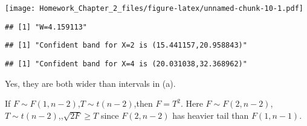 \documentclass[]{article}
\newenvironment{Shaded}{\begin{snugshade}}{\end{snugshade}}
\newcommand{\KeywordTok}[1]{\textcolor[rgb]{0.13,0.29,0.53}{\textbf{#1}}}
\newcommand{\DecValTok}[1]{\textcolor[rgb]{0.00,0.00,0.81}{#1}}
\newcommand{\StringTok}[1]{\textcolor[rgb]{0.31,0.60,0.02}{#1}}
\newcommand{\NormalTok}[1]{#1}
\begin{document}
\texttt{[image: Homework\_Chapter\_2\_files/figure-latex/unnamed-chunk-10-1.pdf]}

\begin{Shaded}
\end{Shaded}

\begin{verbatim}
## [1] "W=4.159113"
\end{verbatim}

\begin{Shaded}
\end{Shaded}

\begin{verbatim}
## [1] "Confident band for X=2 is (15.441157,20.958843)"
\end{verbatim}

\begin{Shaded}
\end{Shaded}

\begin{verbatim}
## [1] "Confident band for X=4 is (20.031038,32.368962)"
\end{verbatim}

Yes, they are both wider than intervals in (a).

If \(F\sim F(1,n-2)\),\(T\sim t(n-2)\),then \(F=T^2\). Here
\(F\sim F(2,n-2)\),\(T\sim t(n-2)\),,\(\sqrt{2F}\geqslant T\) since
\(F(2,n-2)\) has heavier tail than \(F(1,n-1)\).
\end{document}
